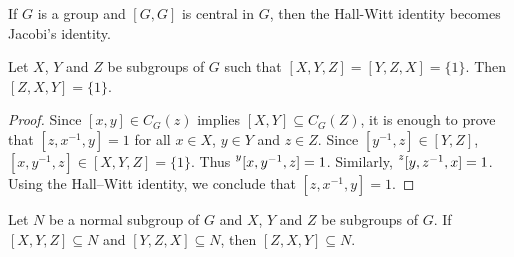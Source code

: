 If $G$ is a group and $[G,G]$ is central in $G$,
then the Hall-Witt identity becomes Jacobi's identity.

\begin{lemma}
	\label{lemma:3subgrupos}
	Let $X$, $Y$ and $Z$ be subgroups of $G$ 
 such that $[X,Y,Z]=[Y,Z,X]=\{1\}$.
	Then $[Z,X,Y]=\{1\}$.
\end{lemma}

\begin{proof}
Since $[x,y]\in C_G(z)$ implies $[X,Y]\subseteq C_G(Z)$, 
it is enough to prove that $[z,x^{-1},y]=1$ for all $x\in X$, $y\in Y$ and $z\in Z$. Since $[y^{-1},z]\in [Y,Z]$, $[x,y^{-1},z]\in [X,Y,Z]=\{1\}$. Thus $\prescript{y}{}[x,y^{-1},z]=1$. Similarly, $\prescript{z}{}[y,z^{-1},x]=1$. Using the Hall--Witt identity, we conclude that $[z,x^{-1},y]=1$.
\end{proof}

\begin{exercise}
\label{xca:3subgroups}
Let $N$ be a normal subgroup of $G$ and 
$X$, $Y$ and $Z$ be subgroups of $G$. If $[X,Y,Z]\subseteq N$ and $[Y,Z,X]\subseteq N$, then 
$[Z,X,Y]\subseteq N$.
\end{exercise}


